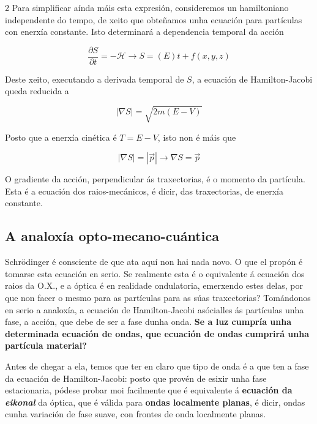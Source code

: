 \begin{refsection}
\begin{multicols}{2}
Para simplificar aínda máis esta expresión, consideremos un hamiltoniano
independente do tempo, de xeito que obteñamos unha ecuación para partículas con
enerxía constante. Isto determinará a dependencia temporal da acción

\begin{equation}
    \frac{\partial S}{\partial t} = -\mathcal{H} \rightarrow
    \boxed{S=(E)t + f(x,y,z)}
\end{equation}

Deste xeito, executando a derivada temporal de $S$, a ecuación de
Hamilton-Jacobi queda reducida a

\begin{equation}
    |\nabla S| = \sqrt{2m(E-V)}
\end{equation}

Posto que a enerxía cinética é $T=E-V$, isto non é máis que

\begin{equation}
    |\nabla S| =  |\vec{p}| \rightarrow \boxed{\nabla S = \vec{p}}
\end{equation}

O gradiente da acción, perpendicular ás traxectorias, é o momento da partícula.
Esta é a ecuación dos raios-mecánicos, é dicir, das traxectorias, de enerxía
constante.

\subsection*{A analoxía opto-mecano-cuántica}

Schrödinger é consciente de que ata aquí non hai nada novo. O que el propón é
tomarse esta ecuación en serio. Se realmente esta é o equivalente á ecuación
dos raios da O.X., e a óptica é en realidade ondulatoria, emerxendo estes
delas, por que non facer o mesmo para as partículas para as súas traxectorias?
Tomándonos en serio a analoxía, a ecuación de Hamilton-Jacobi asócialles ás
partículas unha fase, a acción, que debe de ser a fase dunha onda. \textbf{Se a
luz cumpría unha determinada ecuación de ondas, que ecuación de ondas cumprirá
unha partícula material?}

Antes de chegar a ela, temos que ter en claro que tipo de onda é a que ten a
fase da ecuación de Hamilton-Jacobi: posto que provén de esixir unha fase
estacionaria, pódese probar moi facilmente que é equivalente á \textbf{ecuación
da \textit{eikonal}} da óptica, que é válida para \textbf{ondas
localmente planas}, é dicir, ondas cunha variación de fase suave, con frontes
de onda localmente planas.


\end{multicols}
\end{refsection}
